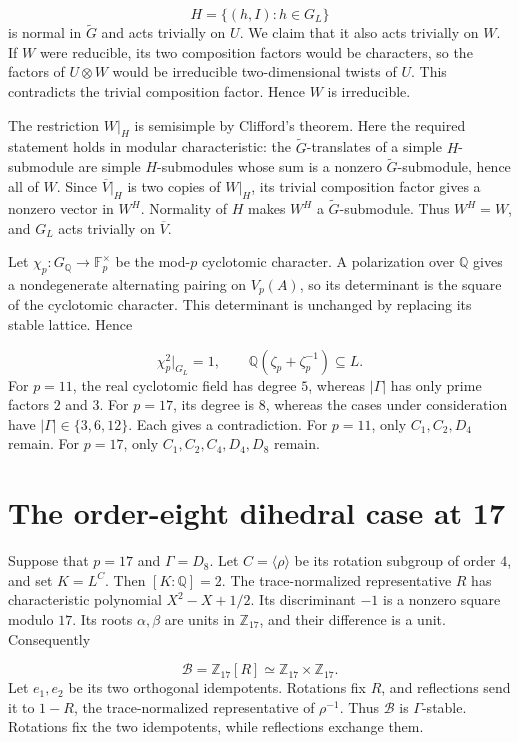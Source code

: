 \documentclass[11pt]{article}
\newcommand{\Q}{\mathbb Q}
\newcommand{\Z}{\mathbb Z}
\newcommand{\F}{\mathbb F}
\begin{document}
\[
H=\{(h,I):h\in G_L\}
\]
is normal in \(\widetilde G\) and acts trivially on \(U\). We claim that it also acts trivially on \(W\). If \(W\) were reducible, its two composition factors would be characters, so the factors of \(U\otimes W\) would be irreducible two-dimensional twists of \(U\). This contradicts the trivial composition factor. Hence \(W\) is irreducible.

The restriction \(W|_H\) is semisimple by Clifford's theorem. Here the required statement holds in modular characteristic: the \(\widetilde G\)-translates of a simple \(H\)-submodule are simple \(H\)-submodules whose sum is a nonzero \(\widetilde G\)-submodule, hence all of \(W\). Since \(\overline V|_H\) is two copies of \(W|_H\), its trivial composition factor gives a nonzero vector in \(W^H\). Normality of \(H\) makes \(W^H\) a \(\widetilde G\)-submodule. Thus \(W^H=W\), and \(G_L\) acts trivially on \(\overline V\).

Let \(\chi_p:G_{\Q}\to\F_p^\times\) be the mod-\(p\) cyclotomic character. A polarization over \(\Q\) gives a nondegenerate alternating pairing on \(V_p(A)\), so its determinant is the square of the cyclotomic character. This determinant is unchanged by replacing its stable lattice. Hence

\[
\chi_p^2|_{G_L}=1,
\qquad \Q(\zeta_p+\zeta_p^{-1})\subseteq L.
\]
For \(p=11\), the real cyclotomic field has degree \(5\), whereas \(|\Gamma|\) has only prime factors \(2\) and \(3\). For \(p=17\), its degree is \(8\), whereas the cases under consideration have \(|\Gamma|\in\{3,6,12\}\). Each gives a contradiction. For \(p=11\), only \(C_1,C_2,D_4\) remain. For \(p=17\), only \(C_1,C_2,C_4,D_4,D_8\) remain.


\section{The order-eight dihedral case at 17}\label{sec:split-rotation}
Suppose that \(p=17\) and \(\Gamma=D_8\). Let \(C=\langle\rho\rangle\) be its rotation subgroup of order \(4\), and set \(K=L^C\). Then \([K:\Q]=2\). The trace-normalized representative \(R\) has characteristic polynomial \(X^2-X+1/2\). Its discriminant \(-1\) is a nonzero square modulo \(17\). Its roots \(\alpha,\beta\) are units in \(\Z_{17}\), and their difference is a unit. Consequently

\[
\mathcal B=\Z_{17}[R]\simeq\Z_{17}\times\Z_{17}.
\]
Let \(e_1,e_2\) be its two orthogonal idempotents. Rotations fix \(R\), and reflections send it to \(1-R\), the trace-normalized representative of \(\rho^{-1}\). Thus \(\mathcal B\) is \(\Gamma\)-stable. Rotations fix the two idempotents, while reflections exchange them.
\end{document}
